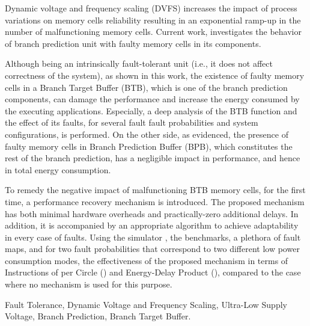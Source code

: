 
\begin{abstracteng}
    
    Dynamic voltage and frequency scaling (DVFS) increases the impact of process variations on memory cells reliability resulting in an exponential ramp-up in the number of malfunctioning memory cells. Current work, investigates the behavior of branch prediction unit with faulty memory cells in its components.
    
    Although being an intrinsically fault-tolerant unit (i.e., it does not affect correctness of the system), as shown in this work, the existence of faulty memory cells in a Branch Target Buffer (BTB), which is one of the branch prediction components, can damage the performance and increase the energy consumed by the executing applications. Especially, a deep analysis of the BTB function and the effect of its faults, for several fault fault probabilities and system configurations, is performed. On the other side, as evidenced, the presence of faulty memory cells in Branch Prediction Buffer (BPB), which constitutes the rest of the branch prediction, has a negligible impact in performance, and hence in total energy consumption.
    
    To remedy the negative impact of malfunctioning BTB memory cells, for the first time, a performance recovery mechanism is introduced. The proposed mechanism has both minimal hardware overheads and practically-zero additional delays. In addition, it is accompanied by an appropriate algorithm to achieve adaptability in every case of faults. Using the simulator \gem, the \spec benchmarks, a plethora of fault maps, and for two fault probabilities that correspond to two different low power consumption modes, the effectiveness of the proposed mechanism in terms of Instructions of per Circle (\ipc) and Energy-Delay Product (\edp), compared to the case where no mechanism is used for this purpose.
    
    \begin{keywordseng}
        Fault Tolerance, Dynamic Voltage and Frequency Scaling, Ultra-Low Supply Voltage, Branch Prediction, Branch Target Buffer.
    \end{keywordseng}
    
\end{abstracteng}
